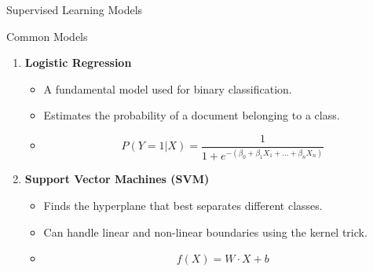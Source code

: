 \documentclass[aspectratio=169]{beamer}
\begin{document}
\begin{frame}[fragile]{Supervised Learning Models}
    \begin{block}{Common Models}
        \begin{enumerate}
            \item \textbf{Logistic Regression}
                \begin{itemize}
                    \item A fundamental model used for binary classification.
                    \item Estimates the probability of a document belonging to a class.
                    \item \begin{equation}
                    P(Y=1|X) = \frac{1}{1 + e^{-(\beta_0 + \beta_1X_1 + ... + \beta_nX_n)}}
                    \end{equation}
                \end{itemize}
            \item \textbf{Support Vector Machines (SVM)}
                \begin{itemize}
                    \item Finds the hyperplane that best separates different classes.
                    \item Can handle linear and non-linear boundaries using the kernel trick.
                    \item \begin{equation}
                    f(X) = W \cdot X + b
                    \end{equation}
                \end{itemize}
        \end{enumerate}
    \end{block}
\end{frame}
\end{document}
